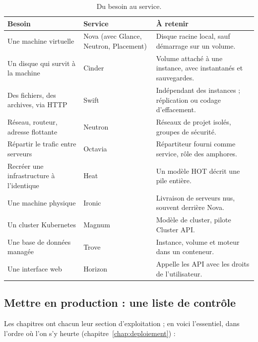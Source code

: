 \begin{table}[!ht]
\centering
\renewcommand{\arraystretch}{1.25}
\small
\begin{tabular}{@{}>{\raggedright\arraybackslash}p{4.5cm}>{\raggedright\arraybackslash}p{3.7cm}>{\raggedright\arraybackslash}p{7.2cm}@{}}
\toprule
\textbf{Besoin} & \textbf{Service} & \textbf{À retenir} \\
\midrule
Une machine virtuelle & Nova (avec Glance, Neutron, Placement) & Disque racine local, sauf démarrage sur un volume. \\
Un disque qui survit à la machine & Cinder & Volume attaché à une instance, avec instantanés et sauvegardes. \\
Des fichiers, des archives, via HTTP & Swift & Indépendant des instances ; réplication ou codage d'effacement. \\
Réseau, routeur, adresse flottante & Neutron & Réseaux de projet isolés, groupes de sécurité. \\
Répartir le trafic entre serveurs & Octavia & Répartiteur fourni comme service, rôle des amphores. \\
Recréer une infrastructure à l'identique & Heat & Un modèle HOT décrit une pile entière. \\
Une machine physique & Ironic & Livraison de serveurs nus, souvent derrière Nova. \\
Un cluster Kubernetes & Magnum & Modèle de cluster, pilote Cluster API. \\
Une base de données managée & Trove & Instance, volume et moteur dans un conteneur. \\
Une interface web & Horizon & Appelle les API avec les droits de l'utilisateur. \\
\bottomrule
\end{tabular}
\caption{Du besoin au service.}
\label{tab:concl-besoins}
\end{table}

\subsection*{Mettre en production : une liste de contrôle}

Les chapitres ont chacun leur section d'exploitation ; en voici l'essentiel, dans l'ordre où l'on s'y heurte (chapitre~\ref{chap:deploiement}) :

